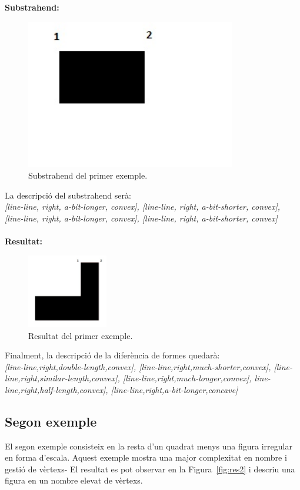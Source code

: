 \documentclass{article}
\begin{document}
{\bf Substrahend:}
\begin{figure}[!h]
\centering
\includegraphics[width=260pt]{images/quad_menut.jpg}
\caption {Substrahend del primer exemple.}
\label {fig:quad_menut}
\end{figure}

La descripció del substrahend serà:
\\
\emph {[line-line, right, a-bit-longer, convex], [line-line, right, a-bit-shorter, convex], [line-line, right, a-bit-longer, convex], [line-line, right, a-bit-shorter, convex]}
\\
\\
{\bf Resultat:}
\begin{figure}[!h]
\centering
\includegraphics[width=100pt]{images/res1.jpg}
\caption {Resultat del primer exemple.}
\label {fig:res1}
\end{figure}

Finalment, la descripció de la diferència de formes quedarà:
\\
\emph {[line-line,right,double-length,convex], [line-line,right,much-shorter,convex], [line-line,right,similar-length,convex], [line-line,right,much-longer,convex], line-line,right,half-length,convex], [line-line,right,a-bit-longer,concave]}

\subsection{Segon exemple}
El segon exemple consisteix en la resta d'un quadrat menys una figura irregular en forma d'escala.
Aquest exemple mostra una major complexitat en nombre i gestió de vèrtexs-
El resultat es pot observar en la Figura~\ref{fig:res2} i descriu una figura en un nombre elevat de vèrtexs.
\\
\\
\end{document}
